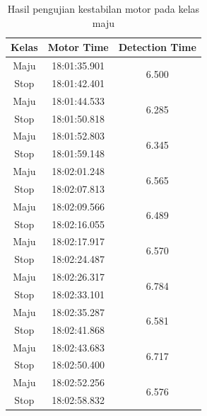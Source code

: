 \begin{longtable}{|c|c|c|}
  \caption{Hasil pengujian kestabilan motor pada kelas maju} 
  \label{tb:motormaju} \\
  \hline
  \rowcolor[HTML]{C0C0C0} 
  \textbf{Kelas} & \textbf{Motor Time} & \textbf{Detection Time} \\ \hline
  Maju           & 18:01:35.901        & \multirow{2}{*}{6.500}  \\ \cline{1-2}
  Stop           & 18:01:42.401        &                         \\ \hline
  Maju           & 18:01:44.533        & \multirow{2}{*}{6.285}  \\ \cline{1-2}
  Stop           & 18:01:50.818        &                         \\ \hline
  Maju           & 18:01:52.803        & \multirow{2}{*}{6.345}  \\ \cline{1-2}
  Stop           & 18:01:59.148        &                         \\ \hline
  Maju           & 18:02:01.248        & \multirow{2}{*}{6.565}  \\ \cline{1-2}
  Stop           & 18:02:07.813        &                         \\ \hline
  Maju           & 18:02:09.566        & \multirow{2}{*}{6.489}  \\ \cline{1-2}
  Stop           & 18:02:16.055        &                         \\ \hline
  Maju           & 18:02:17.917        & \multirow{2}{*}{6.570}  \\ \cline{1-2}
  Stop           & 18:02:24.487        &                         \\ \hline
  Maju           & 18:02:26.317        & \multirow{2}{*}{6.784}  \\ \cline{1-2}
  Stop           & 18:02:33.101        &                         \\ \hline
  Maju           & 18:02:35.287        & \multirow{2}{*}{6.581}  \\ \cline{1-2}
  Stop           & 18:02:41.868        &                         \\ \hline
  Maju           & 18:02:43.683        & \multirow{2}{*}{6.717}  \\ \cline{1-2}
  Stop           & 18:02:50.400        &                         \\ \hline
  Maju           & 18:02:52.256        & \multirow{2}{*}{6.576}  \\ \cline{1-2}
  Stop           & 18:02:58.832        &                         \\ \hline

\end{longtable}
